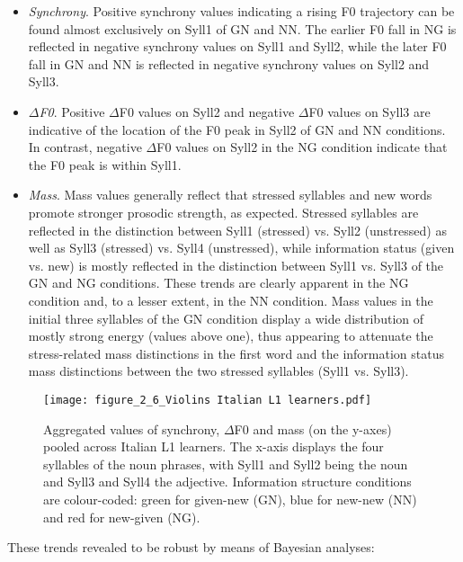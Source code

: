 \begin{itemize}
\item \textit{Synchrony}. Positive synchrony values indicating a rising F0 trajectory can be found almost exclusively on Syll1 of GN and NN. The earlier F0 fall in NG is reflected in negative synchrony values on Syll1 and Syll2, while the later F0 fall in GN and NN is reflected in negative synchrony values on Syll2 and Syll3.
\item \textit{${\Delta}$F0}. Positive ${\Delta}$F0 values on Syll2 and negative ${\Delta}$F0 values on Syll3 are indicative of the location of the F0 peak in Syll2 of GN and NN conditions. In contrast, negative ${\Delta}$F0 values on Syll2 in the NG condition indicate that the F0 peak is within Syll1.
\item \textit{Mass}. Mass values generally reflect that stressed syllables and new words promote stronger prosodic strength, as expected. Stressed syllables are reflected in the distinction between Syll1 (stressed) vs. Syll2 (unstressed) as well as Syll3 (stressed) vs. Syll4 (unstressed), while information status (given vs. new) is mostly reflected in the distinction between Syll1 vs. Syll3 of the GN and NG conditions. These trends are clearly apparent in the NG condition and, to a lesser extent, in the NN condition. Mass values in the initial three syllables of the GN condition display a wide distribution of mostly strong energy (values above one), thus appearing to attenuate the stress-related mass distinctions in the first word and the information status mass distinctions between the two stressed syllables (Syll1 vs. Syll3).
\end{itemize}

\begin{figure}
\texttt{[image: figure\_2\_6\_Violins Italian L1 learners.pdf]}
\caption{Aggregated values of synchrony, ${\Delta}$F0 and mass (on the y-axes) pooled across Italian L1 learners. The x-axis displays the four syllables of the noun phrases, with Syll1 and Syll2 being the noun and Syll3 and Syll4 the adjective. Information structure conditions are colour-coded: green for given-new (GN), blue for new-new (NN) and red for new-given (NG).}
\label{fig:2.6}
\end{figure}

These trends revealed to be robust by means of Bayesian analyses:

